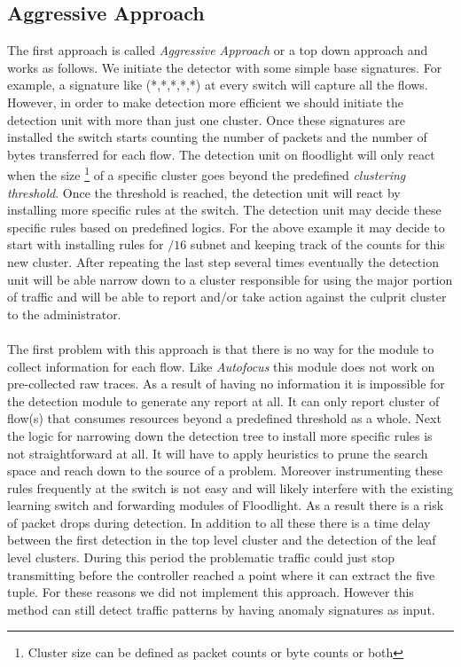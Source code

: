 \documentclass[twocolumn]{article}
\begin{document}
\subsection{Aggressive Approach}
The first approach is called \emph{Aggressive Approach} or a top down approach and works as follows. We initiate the detector with some simple base signatures. For example, a signature like (*,*,*,*,*) at every switch will capture all the flows. However, in order to make detection more efficient we should initiate the detection unit with more than just one cluster. Once these signatures are installed the switch starts counting the number of packets and the number of bytes transferred for each flow. The detection unit on floodlight will only react when the size \footnote{Cluster size can be defined as packet counts or byte counts or both} of a specific cluster goes beyond the predefined \emph{clustering threshold}. Once the threshold is reached, the detection unit will react by installing more specific rules at the switch. The detection unit may decide these specific rules based on predefined logics. For the above example it may decide to start with installing rules for $/16$ subnet and keeping track of the counts for this new cluster. After repeating the last step several times eventually the detection unit will be able narrow down to a cluster responsible for using the major portion of traffic and will be able to report and/or take action against the culprit cluster to the administrator. \\\\
The first problem with this approach is that there is no way for the module to collect information for each flow. Like \emph{Autofocus} this module does not work on pre-collected raw traces. As a result of having no information it is impossible for the detection module to generate any report at all. It can only report cluster of flow(s) that consumes resources beyond a predefined threshold as a whole. Next the logic for narrowing down the detection tree to install more specific rules is not straightforward at all. It will have to apply heuristics to prune the search space and reach down to the source of a problem. Moreover instrumenting these rules frequently at the switch is not easy and will likely interfere with the existing learning switch and forwarding modules of Floodlight. As a result there is a risk of packet drops during detection. In addition to all these there is a time delay between the first detection in the top level cluster and the detection of the leaf level clusters. During this period the problematic traffic could just stop transmitting before the controller reached a point where it can extract the five tuple. For these reasons we did not implement this approach. However this method can still detect traffic patterns by having anomaly signatures as input. 
\end{document}

